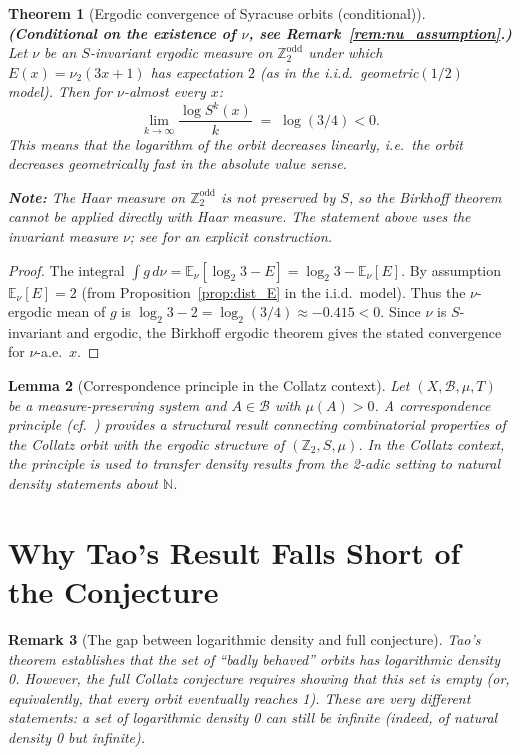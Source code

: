\documentclass[12pt,a4paper]{article}
\newtheorem{theorem}{Theorem}[section]
\newtheorem{lemma}[theorem]{Lemma}
\newtheorem{remark}[theorem]{Remark}
\begin{document}
\begin{theorem}[Ergodic convergence of Syracuse orbits (conditional)]\label{thm:ergodic_conv}
\textbf{(Conditional on the existence of $\nu$, see Remark~\ref{rem:nu_assumption}.)}
Let $\nu$ be an $S$-invariant ergodic measure on $\mathbb{Z}_2^{\text{odd}}$ under which
$E(x) = \nu_2(3x+1)$ has expectation $2$ (as in the i.i.d.\ geometric$(1/2)$ model).
Then for $\nu$-almost every $x$:
\[
  \lim_{k \to \infty} \frac{\log S^k(x)}{k} \;=\; \log(3/4) < 0.
\]
This means that the logarithm of the orbit decreases linearly, i.e.\ the orbit decreases
\emph{geometrically fast} in the absolute value sense.

\textbf{Note:} The Haar measure on $\mathbb{Z}_2^{\text{odd}}$ is \emph{not} preserved
by $S$, so the Birkhoff theorem cannot be applied directly with Haar measure.
The statement above uses the invariant measure $\nu$; see \cite{Kontorovich2010}
for an explicit construction.
\end{theorem}

\begin{proof}
The integral $\int g\, d\nu = \mathbb{E}_\nu[\log_2 3 - E] = \log_2 3 - \mathbb{E}_\nu[E]$.
By assumption $\mathbb{E}_\nu[E] = 2$
(from Proposition~\ref{prop:dist_E} in the i.i.d.\ model).
Thus the $\nu$-ergodic mean of $g$ is $\log_2 3 - 2 = \log_2(3/4) \approx -0.415 < 0$.
Since $\nu$ is $S$-invariant and ergodic, the Birkhoff ergodic theorem gives the stated
convergence for $\nu$-a.e.\ $x$.
\end{proof}

\begin{lemma}[Correspondence principle in the Collatz context]\label{lem:furstenberg}
Let $(X, \mathcal{B}, \mu, T)$ be a measure-preserving system and $A \in \mathcal{B}$
with $\mu(A) > 0$. A correspondence principle (cf.~\cite{Tao2022}) provides a structural result
connecting combinatorial properties of the Collatz orbit with the ergodic structure of
$(\mathbb{Z}_2, S, \mu)$.
In the Collatz context, the principle is used to transfer density results from the
2-adic setting to natural density statements about $\mathbb{N}$.
\end{lemma}

\section{Why Tao's Result Falls Short of the Conjecture}

\begin{remark}[The gap between logarithmic density and full conjecture]\label{rem:gap}
Tao's theorem establishes that the set of ``badly behaved'' orbits has logarithmic density 0.
However, the full Collatz conjecture requires showing that this set is \emph{empty} (or,
equivalently, that every orbit eventually reaches 1). These are very different statements:
a set of logarithmic density 0 can still be infinite (indeed, of natural density 0 but
infinite).
\end{remark}
\end{document}
